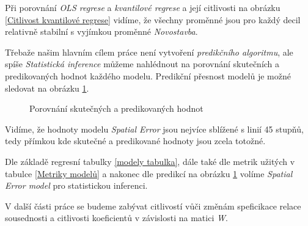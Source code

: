 \documentclass[11pt, a4paper]{article}
\begin{document}
Při porovnání \textit{OLS regrese} a \textit{kvantilové regrese} a její citlivosti na obrázku \ref{Citlivost kvantilové regrese} vidíme, že všechny proměnné jsou pro každý decil relativně stabilní s vyjímkou proměnné \textit{Novostavba}.

\clearpage

Třebaže našim hlavním cílem práce není vytvoření \textit{predikčního algoritmu}, ale spíše \textit{Statistická inference} můžeme nahlédnout na porovnání skutečních a predikovaných hodnot každého modelu. Predikční přesnost modelů je možné sledovat na obrázku \ref{Porovnání skutečných a predikovaných hodnot}.

\begin{figure}[ht]
\centering
\noindent{}
\caption{Porovnání skutečných a predikovaných hodnot}
\label{Porovnání skutečných a predikovaných hodnot}
\end{figure}

Vidíme, že hodnoty modelu \textit{Spatial Error} jsou nejvíce sblížené s linií 45 stupňů, tedy přímkou kde skutečné a predikované hodnoty jsou zcela totožné.

Dle základě regresní tabulky \ref{modely tabulka}, dále také dle metrik užitých v tabulce \ref{Metriky modelů} a nakonec dle predikcí na obrázku \ref{Porovnání skutečných a predikovaných hodnot} volíme \textit{Spatial Error model} pro statistickou inferenci.

V další části práce se budeme zabývat citlivostí vůči změnám speficikace relace sousednosti a citlivosti koeficientů v závislosti na matici \textit{W}.
\clearpage
\end{document}

